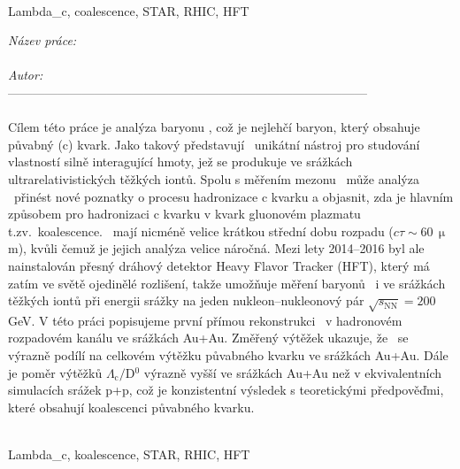  \\
\noindent  Lambda\_c, coalescence, STAR, RHIC, HFT

%
 \newpage
 \noindent
{\it N\' azev pr\' ace:}\\
{\bf \czechtitle}\\

\noindent
{\it Autor:} \myself\\
--------------------------------------------------------------------------------------- \\


 \\
Cílem této práce je analýza baryonu \Lambdac, což je nejlehčí baryon, který obsahuje půvabný (c) kvark. Jako takový představují \Lambdac\ unikátní nástroj pro studování vlastností silně interagující hmoty, jež se produkuje ve srážkách ultrarelativistických těžkých iontů. Spolu s měřením mezonu \dzero\ může analýza \Lambdac\ přinést nové poznatky o procesu hadronizace c kvarku a objasnit, zda je hlavním způsobem pro hadronizaci c kvarku v kvark gluonovém plazmatu t.zv.\ koalescence. \Lambdac\ mají nicméně velice krátkou střední dobu rozpadu ($c \tau \sim 60\,\upmu$m), kvůli čemuž je jejich analýza velice náročná. Mezi lety 2014--2016 byl ale nainstalován přesný dráhový detektor Heavy Flavor Tracker (HFT), který má zatím ve světě ojedinělé rozlišení, takže umožňuje měření baryonů \Lambdac\ i ve srážkách těžkých iontů při energii srážky na jeden nukleon--nukleonový pár $\sqrt{s_\mathrm{NN}} = 200\,$GeV. V této práci popisujeme první přímou rekonstrukci \Lambdac\ v hadronovém rozpadovém kanálu ve srážkách Au+Au. Změřený výtěžek ukazuje, že \Lambdac\ se výrazně podílí na celkovém výtěžku půvabného kvarku ve srážkách Au+Au. Dále je poměr výtěžků $\Lambda_\mathrm{c}/$D$^0$ výrazně vyšší ve srážkách Au+Au než v ekvivalentních simulacích srážek p+p, což je konzistentní výsledek s teoretickými předpověďmi, které obsahují koalescenci půvabného kvarku. 

 \\
Lambda\_c, koalescence, STAR, RHIC, HFT


%
